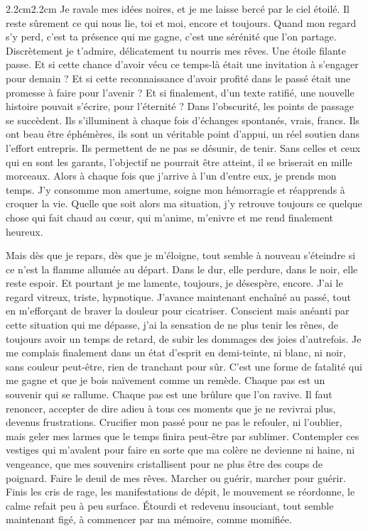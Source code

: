 \begin{adjustwidth}{2.2cm}{2.2cm}
Je ravale mes idées noires, et je me laisse bercé par le ciel étoilé. Il reste sûrement ce qui nous lie, toi et moi, encore et toujours. Quand mon regard s’y perd, c’est ta présence qui me gagne, c’est une sérénité que l’on partage. Discrètement je t’admire, délicatement tu nourris mes rêves. Une étoile filante passe. Et si cette chance d’avoir vécu ce temps-là était une invitation à s’engager pour demain ? Et si cette reconnaissance d’avoir profité dans le passé était une promesse à faire pour l’avenir ? Et si finalement, d’un texte ratifié, une nouvelle histoire pouvait s’écrire, pour l’éternité ?
Dans l’obscurité, les points de passage se succèdent. Ils s’illuminent à chaque fois d’échanges spontanés, vrais, francs. Ils ont beau être éphémères, ils sont un véritable point d’appui, un réel soutien dans l’effort entrepris. Ils permettent de ne pas se désunir, de tenir. Sans celles et ceux qui en sont les garants, l’objectif ne pourrait être atteint, il se briserait en mille morceaux. Alors à chaque fois que j’arrive à l’un d’entre eux, je prends mon temps. J’y consomme mon amertume, soigne mon hémorragie et réapprends à croquer la vie. Quelle que soit alors ma situation, j’y retrouve toujours ce quelque chose qui fait chaud au cœur, qui m’anime, m’enivre et me rend finalement heureux. 

Mais dès que je repars, dès que je m’éloigne, tout semble à nouveau s’éteindre si ce n'est la flamme allumée au départ. Dans le dur, elle perdure, dans le noir, elle reste espoir. Et pourtant je me lamente, toujours, je désespère, encore. J’ai le regard vitreux, triste, hypnotique. J’avance maintenant enchaîné au passé, tout en m’efforçant de braver la douleur pour cicatriser. Conscient mais anéanti par cette situation qui me dépasse, j’ai la sensation de ne plus tenir les rênes, de toujours avoir un temps de retard, de subir les dommages des joies d’autrefois. Je me complais finalement dans un état d’esprit en demi-teinte, ni blanc, ni noir, sans couleur peut-être, rien de tranchant pour sûr. C’est une forme de fatalité qui me gagne et que je bois naïvement comme un remède. Chaque pas est un souvenir qui se rallume. Chaque pas est une brûlure que l’on ravive. Il faut renoncer, accepter de dire adieu à tous ces moments que je ne revivrai plus, devenus frustrations. Crucifier mon passé pour ne pas le refouler, ni l’oublier, mais geler mes larmes que le temps finira peut-être par sublimer. Contempler ces vestiges qui m’avalent pour faire en sorte que ma colère ne devienne ni haine, ni vengeance, que mes souvenirs cristallisent pour ne plus être des coups de poignard. Faire le deuil de mes rêves. Marcher ou guérir, marcher pour guérir. Finis les cris de rage, les manifestations de dépit, le mouvement se réordonne, le calme refait peu à peu surface. Étourdi et redevenu insouciant, tout semble maintenant figé, à commencer par ma mémoire, comme momifiée.


\end{adjustwidth}
